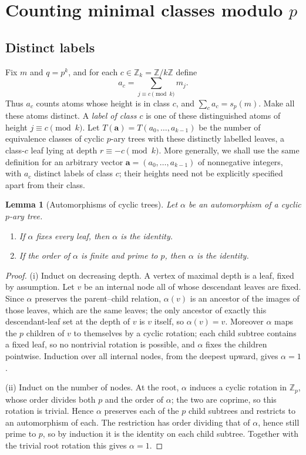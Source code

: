 \documentclass[11pt]{amsart}
\newtheorem{lemma}[theorem]{Lemma}
\theoremstyle{definition}
\theoremstyle{remark}
\newcommand{\Z}{\mathbb Z}
\begin{document}
\section{Counting minimal classes modulo \texorpdfstring{$p$}{p}}
\subsection{Distinct labels}
Fix $m$ and $q=p^k$, and for each $c\in\Z_k=\Z/k\Z$ define
\[
 a_c=\sum_{j\equiv c\pmod k}m_j.
\]
Thus $a_c$ counts atoms whose height is in class $c$, and $\sum_ca_c=s_p(m)$.  Make all these atoms distinct.  A \emph{label of class $c$} is one of these distinguished atoms of height $j\equiv c\pmod k$.  Let $T(\mathbf a)=T(a_0,\ldots,a_{k-1})$ be the number of equivalence classes of cyclic $p$-ary trees with these distinctly labelled leaves, a class-$c$ leaf lying at depth $r\equiv-c\pmod k$.  More generally, we shall use the same definition for an arbitrary vector $\mathbf a=(a_0,\ldots,a_{k-1})$ of nonnegative integers, with $a_c$ distinct labels of class $c$; their heights need not be explicitly specified apart from their class.
\begin{lemma}[Automorphisms of cyclic trees]\label{lem:aut-order}
Let $\alpha$ be an automorphism of a cyclic $p$-ary tree.
\begin{enumerate}
\item[\textup{(i)}] If $\alpha$ fixes every leaf, then $\alpha$ is the identity.
\item[\textup{(ii)}] If the order of $\alpha$ is finite and prime to $p$, then $\alpha$ is the identity.
\end{enumerate}
\end{lemma}
\begin{proof}
(i) Induct on decreasing depth.  A vertex of maximal depth is a leaf, fixed by assumption.  Let $v$ be an internal node all of whose descendant leaves are fixed.  Since $\alpha$ preserves the parent--child relation, $\alpha(v)$ is an ancestor of the images of those leaves, which are the same leaves; the only ancestor of exactly this descendant-leaf set at the depth of $v$ is $v$ itself, so $\alpha(v)=v$.  Moreover $\alpha$ maps the $p$ children of $v$ to themselves by a cyclic rotation; each child subtree contains a fixed leaf, so no nontrivial rotation is possible, and $\alpha$ fixes the children pointwise.  Induction over all internal nodes, from the deepest upward, gives $\alpha=1$.

(ii) Induct on the number of nodes.  At the root, $\alpha$ induces a cyclic rotation in $\Z_p$, whose order divides both $p$ and the order of $\alpha$; the two are coprime, so this rotation is trivial.  Hence $\alpha$ preserves each of the $p$ child subtrees and restricts to an automorphism of each.  The restriction has order dividing that of $\alpha$, hence still prime to $p$, so by induction it is the identity on each child subtree.  Together with the trivial root rotation this gives $\alpha=1$.
\end{proof}
\end{document}
